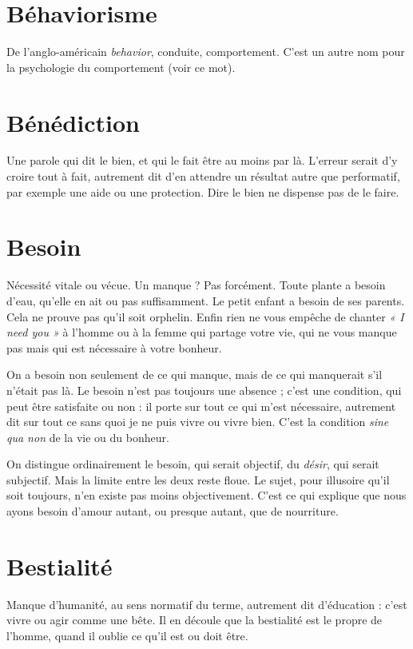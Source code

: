 \section{Béhaviorisme}
De l’anglo-américain {\it behavior}, conduite, comportement.
C’est un autre nom pour la psychologie du comportement (voir ce mot).

\section{Bénédiction}
Une parole qui dit le bien, et qui le fait être au moins par
là. L'erreur serait d’y croire tout à fait, autrement dit d’en
attendre un résultat autre que performatif, par exemple une aide ou une protection.
Dire le bien ne dispense pas de le faire.

\section{Besoin}
Nécessité vitale ou vécue. Un manque ? Pas forcément. Toute plante
a besoin d’eau, qu’elle en ait ou pas suffisamment. Le petit enfant a
besoin de ses parents. Cela ne prouve pas qu’il soit orphelin. Enfin rien ne vous
empêche de chanter {\it « I need you »} à l'homme ou à la femme qui partage votre
vie, qui ne vous manque pas mais qui est nécessaire à votre bonheur.

On a besoin non seulement de ce qui manque, mais de ce qui manquerait
s’il n’était pas là. Le besoin n’est pas toujours une absence ; c’est une condition,
qui peut être satisfaite ou non : il porte sur tout ce qui m'est nécessaire, autrement
dit sur tout ce sans quoi je ne puis vivre ou vivre bien. C’est la condition
{\it sine qua non} de la vie ou du bonheur.

On distingue ordinairement le besoin, qui serait objectif, du {\it désir}, qui serait
subjectif. Mais la limite entre les deux reste floue. Le sujet, pour illusoire qu’il
soit toujours, n’en existe pas moins objectivement. C’est ce qui explique que
nous ayons besoin d’amour autant, ou presque autant, que de nourriture.

\section{Bestialité}
Manque d'humanité, au sens normatif du terme, autrement
dit d'éducation : c’est vivre ou agir comme une bête. Il en
découle que la bestialité est le propre de l’homme, quand il oublie ce qu’il est
ou doit être.

